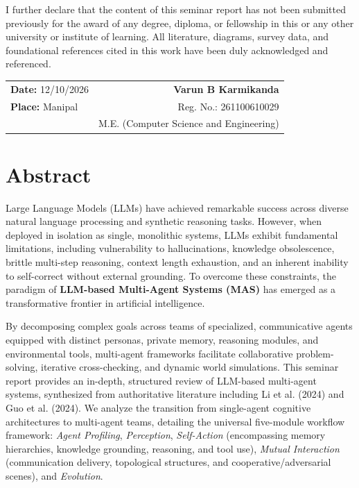 \documentclass[12pt,a4paper]{report}
\begin{document}
\vspace{0.5cm}
\noindent I further declare that the content of this seminar report has not been submitted previously for the award of any degree, diploma, or fellowship in this or any other university or institute of learning. All literature, diagrams, survey data, and foundational references cited in this work have been duly acknowledged and referenced.

\vspace{2.0cm}

\noindent
\begin{tabular*}{\textwidth}{@{\extracolsep{\fill}}lr}
\textbf{Date:} 12/10/2026 & \textbf{Varun B Karmikanda} \\
\textbf{Place:} Manipal & Reg. No.: 261100610029 \\
& M.E. (Computer Science and Engineering) \\
\end{tabular*}

\newpage
\chapter*{Abstract}

Large Language Models (LLMs) have achieved remarkable success across diverse natural language processing and synthetic reasoning tasks. However, when deployed in isolation as single, monolithic systems, LLMs exhibit fundamental limitations, including vulnerability to hallucinations, knowledge obsolescence, brittle multi-step reasoning, context length exhaustion, and an inherent inability to self-correct without external grounding. To overcome these constraints, the paradigm of \textbf{LLM-based Multi-Agent Systems (MAS)} has emerged as a transformative frontier in artificial intelligence. 

By decomposing complex goals across teams of specialized, communicative agents equipped with distinct personas, private memory, reasoning modules, and environmental tools, multi-agent frameworks facilitate collaborative problem-solving, iterative cross-checking, and dynamic world simulations. This seminar report provides an in-depth, structured review of LLM-based multi-agent systems, synthesized from authoritative literature including Li et al. (2024) and Guo et al. (2024). We analyze the transition from single-agent cognitive architectures to multi-agent teams, detailing the universal five-module workflow framework: \textit{Agent Profiling}, \textit{Perception}, \textit{Self-Action} (encompassing memory hierarchies, knowledge grounding, reasoning, and tool use), \textit{Mutual Interaction} (communication delivery, topological structures, and cooperative/adversarial scenes), and \textit{Evolution}. 
\end{document}
